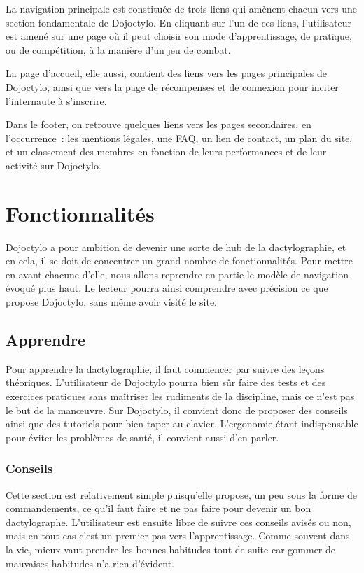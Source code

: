 \documentclass[a4paper,12pt]{article}
\begin{document}
La navigation principale est constituée de trois liens qui amènent chacun vers une section fondamentale de Dojoctylo. En cliquant sur l'un de ces liens, l'utilisateur est amené sur une page où il peut choisir son mode d'apprentissage, de pratique, ou de compétition, à la manière d'un jeu de combat.

La page d'accueil, elle aussi, contient des liens vers les pages principales de Dojoctylo, ainsi que vers la page de récompenses et de connexion pour inciter l'internaute à s'inscrire.

Dans le footer, on retrouve quelques liens vers les pages secondaires, en l'occurrence~: les mentions légales, une FAQ, un lien de contact, un plan du site, et un classement des membres en fonction de leurs performances et de leur activité sur Dojoctylo.

\section{Fonctionnalités}

Dojoctylo a pour ambition de devenir une sorte de hub de la dactylographie, et en cela, il se doit de concentrer un grand nombre de fonctionnalités. Pour mettre en avant chacune d'elle, nous allons reprendre en partie le modèle de navigation évoqué plus haut. Le lecteur pourra ainsi comprendre avec précision ce que propose Dojoctylo, sans même avoir visité le site.

\subsection{Apprendre}

Pour apprendre la dactylographie, il faut commencer par suivre des leçons théoriques. L'utilisateur de Dojoctylo pourra bien sûr faire des tests et des exercices pratiques sans maîtriser les rudiments de la discipline, mais ce n'est pas le but de la manœuvre. Sur Dojoctylo, il convient donc de proposer des conseils ainsi que des tutoriels pour bien taper au clavier. L'ergonomie étant indispensable pour éviter les problèmes de santé, il convient aussi d'en parler.

\subsubsection{Conseils}

Cette section est relativement simple puisqu'elle propose, un peu sous la forme de commandements, ce qu'il faut faire et ne pas faire pour devenir un bon dactylographe. L'utilisateur est ensuite libre de suivre ces conseils avisés ou non, mais en tout cas c'est un premier pas vers l'apprentissage. Comme souvent dans la vie, mieux vaut prendre les bonnes habitudes tout de suite car gommer de mauvaises habitudes n'a rien d'évident.
\end{document}
